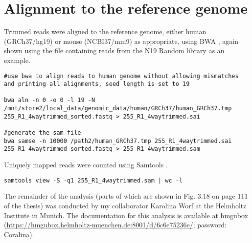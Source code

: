 \section{Alignment to the reference genome}
 
 Trimmed reads were aligned to the reference genome, either human (GRCh37/hg19) or mouse (NCBI37/mm9) as appropriate, using BWA \cite{Li:2009fi}, again shown using the file containing reads from the N19 Random library as an example.
 
\begin{small}\begin{lstlisting}
#use bwa to align reads to human genome without allowing mismatches and printing all alignments, seed length is set to 19

bwa aln -n 0 -o 0 -l 19 -N /mnt/store2/local_data/genomic_data/human/GRCh37/human_GRCh37.tmp 255_R1_4waytrimmed_sorted.fastq > 255_R1_4waytrimmed.sai

#generate the sam file
bwa samse -n 10000 /path2/human_GRCh37.tmp 255_R1_4waytrimmed.sai 255_R1_4waytrimmed_sorted.fastq > 255_R1_4waytrimmed.sam
 \end{lstlisting}\end{small}

Uniquely mapped reads were counted using Samtools \cite{Li:2009kaa}.

\begin{small}\begin{lstlisting}
samtools view -S -q1 255_R1_4waytrimmed.sam | wc -l
\end{lstlisting}\end{small}
 
The remainder of the analysis (parts of which are shown in Fig. 3.18 on page 111 of the thesis) was conducted by my collaborator Karolina Worf at the Helmholtz Institute in Munich. The documentation for this analysis is available at hmgubox (\url{https://hmgubox.helmholtz-muenchen.de:8001/d/6c6e75236e/}; password: Coralina). 

